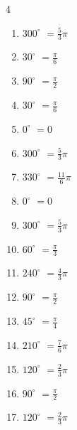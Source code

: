 \begin{multicols}{4}
\begin{enumerate}
  \item $\displaystyle 300^{\circ}$
        $\displaystyle =\frac{5}{3}\pi$

  \item $\displaystyle 30^{\circ}$
        $\displaystyle =\frac{\pi}{6}$

  \item $\displaystyle 90^{\circ}$
        $\displaystyle =\frac{\pi}{2}$

  \item $\displaystyle 30^{\circ}$
        $\displaystyle =\frac{\pi}{6}$

  \item $\displaystyle 0^{\circ}$
        $\displaystyle =0$

  \item $\displaystyle 300^{\circ}$
        $\displaystyle =\frac{5}{3}\pi$

  \item $\displaystyle 330^{\circ}$
        $\displaystyle =\frac{11}{6}\pi$

  \item $\displaystyle 0^{\circ}$
        $\displaystyle =0$

  \item $\displaystyle 300^{\circ}$
        $\displaystyle =\frac{5}{3}\pi$

  \item $\displaystyle 60^{\circ}$
        $\displaystyle =\frac{\pi}{3}$

  \item $\displaystyle 240^{\circ}$
        $\displaystyle =\frac{4}{3}\pi$

  \item $\displaystyle 90^{\circ}$
        $\displaystyle =\frac{\pi}{2}$

  \item $\displaystyle 45^{\circ}$
        $\displaystyle =\frac{\pi}{4}$

\columnbreak %

  \item $\displaystyle 210^{\circ}$
        $\displaystyle =\frac{7}{6}\pi$

  \item $\displaystyle 120^{\circ}$
        $\displaystyle =\frac{2}{3}\pi$

  \item $\displaystyle 90^{\circ}$
        $\displaystyle =\frac{\pi}{2}$

  \item $\displaystyle 120^{\circ}$
        $\displaystyle =\frac{2}{3}\pi$


\end{enumerate}
\end{multicols}
